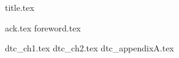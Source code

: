 \documentclass[12pt,letterpaper,oneside]{scrbook}
\begin{document}
\frontmatter

{title.tex}

\clearpage
\thispagestyle{empty}
{ack.tex}
{foreword.tex}

\tableofcontents


\mainmatter
{dtc_ch1.tex}
{dtc_ch2.tex}
\appendix
{dtc_appendixA.tex}


\backmatter



\end{document}
